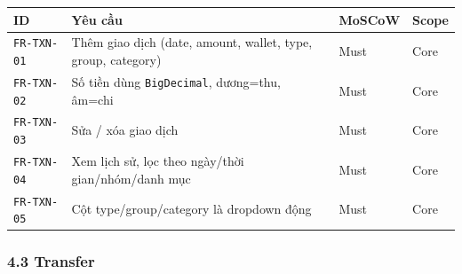 \documentclass[11pt,a4paper]{article}
\newcounter{none}
\begin{document}
{\def\LTcaptype{none}
\begin{longtable}[]{@{}
  >{\raggedright\arraybackslash}p{}
  >{\raggedright\arraybackslash}p{}
  >{\centering\arraybackslash}p{}
  >{\centering\arraybackslash}p{}@{}}
\toprule\noalign{}
\begin{minipage}[b]{\linewidth}\raggedright
ID
\end{minipage} & \begin{minipage}[b]{\linewidth}\raggedright
Yêu cầu
\end{minipage} & \begin{minipage}[b]{\linewidth}\raggedright
MoSCoW
\end{minipage} & \begin{minipage}[b]{\linewidth}\raggedright
Scope
\end{minipage} \\
\midrule\noalign{}
\endhead
\bottomrule\noalign{}
\endlastfoot
\texttt{FR-TXN-01} & Thêm giao dịch (date, amount, wallet, type, group, category) & Must & Core \\ 
\texttt{FR-TXN-02} & Số tiền dùng \texttt{BigDecimal}, dương=thu, âm=chi & Must & Core \\ 
\texttt{FR-TXN-03} & Sửa / xóa giao dịch & Must & Core \\ 
\texttt{FR-TXN-04} & Xem lịch sử, lọc theo ngày/thời gian/nhóm/danh mục & Must & Core \\ 
\texttt{FR-TXN-05} & Cột type/group/category là dropdown động & Must & Core \\
\end{longtable}
}

\subsubsection{4.3 Transfer}\label{transfer}
\end{document}
